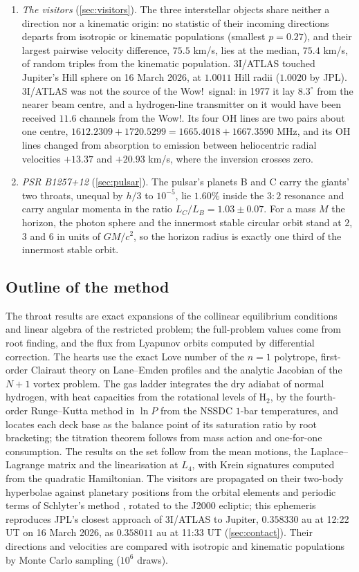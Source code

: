 \documentclass[11pt]{article}
\theoremstyle{definition}\newtheorem{definition}[theorem]{Definition}
\theoremstyle{remark}\newtheorem{remark}[theorem]{Remark}
\begin{document}
\begin{enumerate}[label=\textbf{\arabic*.},leftmargin=1.8em]
\item \emph{The visitors} (\cref{sec:visitors}). The three interstellar objects share neither a direction nor a kinematic origin: no statistic of their incoming directions departs from isotropic or kinematic populations (smallest $p=0.27$), and their largest pairwise velocity difference, $75.5$ km/s, lies at the median, $75.4$ km/s, of random triples from the kinematic population. 3I/ATLAS touched Jupiter's Hill sphere on 16 March 2026, at $1.0011$ Hill radii ($1.0020$ by JPL). 3I/ATLAS was not the source of the Wow!\ signal: in 1977 it lay $8.3^\circ$ from the nearer beam centre, and a hydrogen-line transmitter on it would have been received $11.6$ channels from the Wow!. Its four OH lines are two pairs about one centre, $1612.2309+1720.5299=1665.4018+1667.3590$ MHz, and its OH lines changed from absorption to emission between heliocentric radial velocities $+13.37$ and $+20.93$ km/s, where the inversion crosses zero.
\item \emph{PSR B1257+12} (\cref{sec:pulsar}). The pulsar's planets B and C carry the giants' two throats, unequal by $h/3$ to $10^{-5}$, lie $1.60\%$ inside the $3{:}2$ resonance and carry angular momenta in the ratio $L_C/L_B=1.03\pm0.07$. For a mass $M$ the horizon, the photon sphere and the innermost stable circular orbit stand at $2$, $3$ and $6$ in units of $GM/c^2$, so the horizon radius is exactly one third of the innermost stable orbit.
\end{enumerate}

\subsection{Outline of the method}\label{sec:outline}
The throat results are exact expansions of the collinear equilibrium conditions and linear algebra of the restricted problem; the full-problem values come from root finding, and the flux from Lyapunov orbits computed by differential correction. The hearts use the exact Love number of the $n=1$ polytrope, first-order Clairaut theory on Lane--Emden profiles and the analytic Jacobian of the $N+1$ vortex problem. The gas ladder integrates the dry adiabat of normal hydrogen, with heat capacities from the rotational levels of H$_2$, by the fourth-order Runge--Kutta method in $\ln P$ from the NSSDC $1$-bar temperatures, and locates each deck base as the balance point of its saturation ratio by root bracketing; the titration theorem follows from mass action and one-for-one consumption. The results on the set follow from the mean motions, the Laplace--Lagrange matrix and the linearisation at $L_4$, with Krein signatures computed from the quadratic Hamiltonian. The visitors are propagated on their two-body hyperbolae against planetary positions from the orbital elements and periodic terms of Schlyter's method \cite{Schlyter}, rotated to the J2000 ecliptic; this ephemeris reproduces JPL's closest approach of 3I/ATLAS to Jupiter, $0.358330$ au at 12:22 UT on 16 March 2026, as $0.358011$ au at 11:33 UT (\cref{sec:contact}). Their directions and velocities are compared with isotropic and kinematic populations by Monte Carlo sampling ($10^6$ draws).
\end{document}
